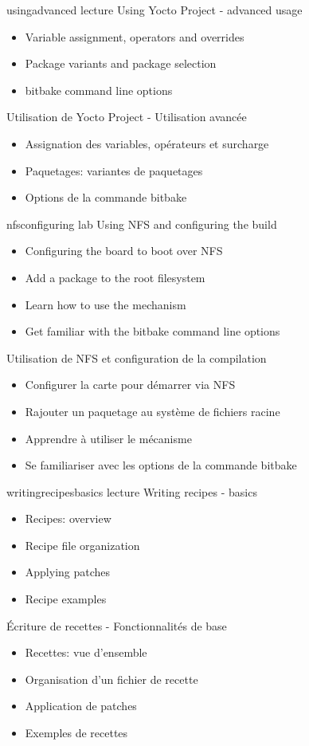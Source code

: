 {usingadvanced}
{lecture}
{Using Yocto Project - advanced usage}
{
  \begin{itemize}
  \item Variable assignment, operators and overrides
  \item Package variants and package selection
  \item bitbake command line options
  \end{itemize}
}
{Utilisation de Yocto Project - Utilisation avancée}
{
  \begin{itemize}
  \item Assignation des variables, opérateurs et surcharge
  \item Paquetages: variantes de paquetages
  \item Options de la commande bitbake
  \end{itemize}
}

{nfsconfiguring}
{lab}
{Using NFS and configuring the build}
{
  \begin{itemize}
  \item Configuring the board to boot over NFS
  \item Add a package to the root filesystem
  \item Learn how to use the  mechanism
  \item Get familiar with the bitbake command line options
  \end{itemize}
}
{Utilisation de NFS et configuration de la compilation}
{
  \begin{itemize}
  \item Configurer la carte pour démarrer via NFS
  \item Rajouter un paquetage au système de fichiers racine
  \item Apprendre à utiliser le mécanisme 
  \item Se familiariser avec les options de la commande bitbake
  \end{itemize}
}

{writingrecipesbasics}
{lecture}
{Writing recipes - basics}
{
  \begin{itemize}
  \item Recipes: overview
  \item Recipe file organization
  \item Applying patches
  \item Recipe examples
  \end{itemize}
}
{Écriture de recettes - Fonctionnalités de base}
{
  \begin{itemize}
  \item Recettes: vue d'ensemble
  \item Organisation d'un fichier de recette
  \item Application de patches
  \item Exemples de recettes
  \end{itemize}
}

